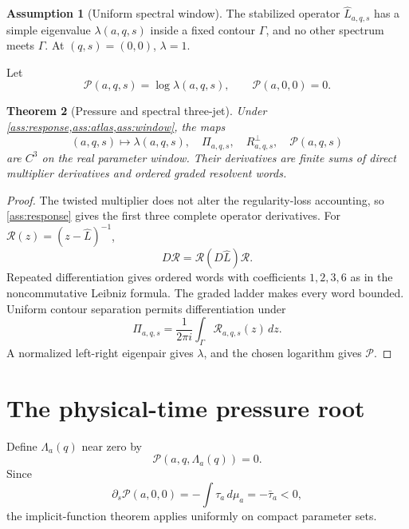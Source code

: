 \documentclass[11pt,reqno]{amsart}
\newtheorem{theorem}{Theorem}[section]
\theoremstyle{definition}
\newtheorem{assumption}[theorem]{Assumption}
\theoremstyle{remark}
\newcommand{\cP}{\mathscr P}
\newcommand{\cR}{\mathscr R}
\begin{document}
\begin{assumption}[Uniform spectral window]\label{ass:window}
The stabilized operator $\widehat L_{a,q,s}$ has a simple eigenvalue
$\lambda(a,q,s)$ inside a fixed contour $\Gamma$, and no other spectrum meets
$\Gamma$.  At $(q,s)=(0,0)$, $\lambda=1$.
\end{assumption}

Let
\begin{equation}\label{eq:pressure}
 \cP(a,q,s)=\log\lambda(a,q,s),
 \qquad \cP(a,0,0)=0.
\end{equation}

\begin{theorem}[Pressure and spectral three-jet]\label{thm:pressure}
Under \cref{ass:response,ass:atlas,ass:window}, the maps
\[
 (a,q,s)\mapsto
 \lambda(a,q,s),\quad \Pi_{a,q,s},\quad R_{a,q,s}^{\perp},\quad
 \cP(a,q,s)
\]
are $C^3$ on the real parameter window.  Their derivatives are finite sums of
direct multiplier derivatives and ordered graded resolvent words.
\end{theorem}

\begin{proof}
The twisted multiplier does not alter the regularity-loss accounting, so
\cref{ass:response} gives the first three complete operator derivatives.
For $\cR(z)=(z-\widehat L)^{-1}$,
\[
 D\cR=\cR(D\widehat L)\cR.
\]
Repeated differentiation gives ordered words with coefficients $1,2,3,6$ as
in the noncommutative Leibniz formula.  The graded ladder makes every word
bounded.  Uniform contour separation permits differentiation under
\[
 \Pi_{a,q,s}=\frac1{2\pi i}\int_\Gamma\cR_{a,q,s}(z)\,dz.
\]
A normalized left-right eigenpair gives $\lambda$, and the chosen logarithm
gives $\cP$.
\end{proof}

\section{The physical-time pressure root}\label{sec:physical}

Define $\Lambda_a(q)$ near zero by
\begin{equation}\label{eq:root}
 \cP(a,q,\Lambda_a(q))=0.
\end{equation}
Since
\begin{equation}\label{eq:Ps}
 \partial_s\cP(a,0,0)=-\int\tau_a\,d\mu_a=-\bar\tau_a<0,
\end{equation}
the implicit-function theorem applies uniformly on compact parameter sets.
\end{document}
